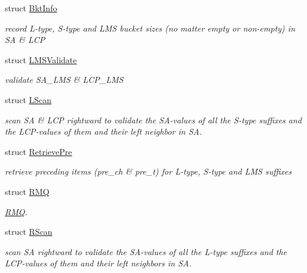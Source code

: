 \begin{DoxyCompactItemize}
\item 
struct \hyperlink{struct_validate4_1_1_bkt_info}{Bkt\+Info}
\begin{DoxyCompactList}\small\item\em record L-\/type, S-\/type and L\+MS bucket sizes (no matter empty or non-\/empty) in SA \& L\+CP \end{DoxyCompactList}\item 
struct \hyperlink{struct_validate4_1_1_l_m_s_validate}{L\+M\+S\+Validate}
\begin{DoxyCompactList}\small\item\em validate S\+A\+\_\+\+L\+MS \& L\+C\+P\+\_\+\+L\+MS \end{DoxyCompactList}\item 
struct \hyperlink{struct_validate4_1_1_l_scan}{L\+Scan}
\begin{DoxyCompactList}\small\item\em scan SA \& L\+CP rightward to validate the S\+A-\/values of all the S-\/type suffixes and the L\+C\+P-\/values of them and their left neighbor in SA. \end{DoxyCompactList}\item 
struct \hyperlink{struct_validate4_1_1_retrieve_pre}{Retrieve\+Pre}
\begin{DoxyCompactList}\small\item\em retrieve preceding items (pre\+\_\+ch \& pre\+\_\+t) for L-\/type, S-\/type and L\+MS suffixes \end{DoxyCompactList}\item 
struct \hyperlink{struct_validate4_1_1_r_m_q}{R\+MQ}
\begin{DoxyCompactList}\small\item\em \hyperlink{struct_validate4_1_1_r_m_q}{R\+MQ}. \end{DoxyCompactList}\item 
struct \hyperlink{struct_validate4_1_1_r_scan}{R\+Scan}
\begin{DoxyCompactList}\small\item\em scan SA rightward to validate the S\+A-\/values of all the L-\/type suffixes and the L\+C\+P-\/values of them and their left neighbors in SA. \end{DoxyCompactList}\end{DoxyCompactItemize}
